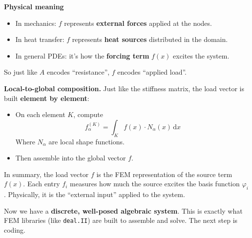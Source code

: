 \begin{itemize}
    \textcolor{Green3}{ \textbf{Physical meaning}}
    \begin{itemize}
        \item In mechanics: $f$ represents \textbf{external forces} applied at the nodes.
        \item In heat transfer: $f$ represents \textbf{heat sources} distributed in the domain.
        \item In general PDEs: it's how the \textbf{forcing term} $f(x)$ excites the system.
    \end{itemize}
    So just like $A$ encodes ``resistance'', $f$ encodes ``applied load''.

    \textcolor{Green3}{ \textbf{Local-to-global composition.}} Just like the stiffness matrix, the load vector is built \textbf{element by element}:
    \begin{itemize}
        \item On each element $K$, compute
        \begin{equation*}
            f^{(K)}_\alpha = \int_K f(x) \cdot N_\alpha(x) \, \mathrm{d}x
        \end{equation*}
        Where $N_{\alpha}$ are local shape functions.
        \item Then assemble into the global vector $f$.
    \end{itemize}
    In summary, the load vector $f$ is the FEM representation of the source term $f(x)$. Each entry $f_{i}$ measures how much the source excites the basis function $\varphi_{i}$. Physically, it is the ``external input'' applied to the system.
\end{itemize}
Now we have a \textbf{discrete, well-posed algebraic system}. This is exactly what FEM libraries (like \texttt{deal.II}) are built to assemble and solve. The next step is coding.